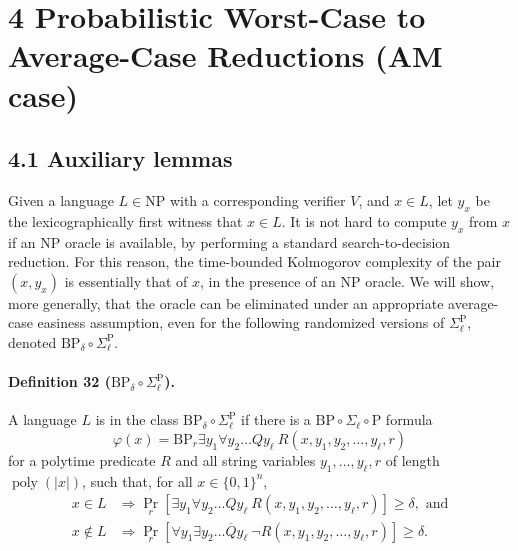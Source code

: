 \section*{4 Probabilistic Worst-Case to Average-Case Reductions (AM case)}
\subsection*{4.1 Auxiliary lemmas}
Given a language $L\in\mathrm{NP}$ with a corresponding verifier $V$, and $x\in L$, let $y_x$ be the lexicographically first witness that $x\in L$. It is not hard to compute $y_x$ from $x$ if an NP oracle is available, by performing a standard search-to-decision reduction. For this reason, the time-bounded Kolmogorov complexity of the pair $(x,y_x)$ is essentially that of $x$, in the presence of an NP oracle. We will show, more generally, that the oracle can be eliminated under an appropriate average-case easiness assumption, even for the following randomized versions of $\Sigma_\ell^\mathrm P$, denoted $\mathrm{BP}_\delta\circ\Sigma_\ell^\mathrm P$.
\paragraph{Definition 32 ($\mathrm{BP}_\delta\circ\Sigma_\ell^\mathrm P$).} A language $L$ is in the class $\mathrm{BP}_\delta\circ\Sigma_\ell^\mathrm P$ if there is a $\mathrm{BP}\circ\Sigma_\ell\circ\mathrm P$ formula
\[\varphi(x)=\mathrm{BP}_r\exists y_1\forall y_2\ldots Qy_\ell\ R(x,y_1,y_2,\ldots,y_\ell,r)\]
for a polytime predicate $R$ and all string variables $y_1,\ldots,y_\ell,r$ of length $\operatorname{poly}(|x|)$, such that, for all $x\in\{0,1\}^n$,
\begin{align*}
x\in L&\Longrightarrow\Pr_r[\exists y_1\forall y_2\ldots Qy_\ell\ R(x,y_1,y_2,\ldots,y_\ell,r)]\geq\delta,\text{ and}\\
x\notin L&\Longrightarrow\Pr_r[\forall y_1\exists y_2\ldots\overline Qy_\ell\ \neg R(x,y_1,y_2,\ldots,y_\ell,r)]\geq\delta.
\end{align*}
